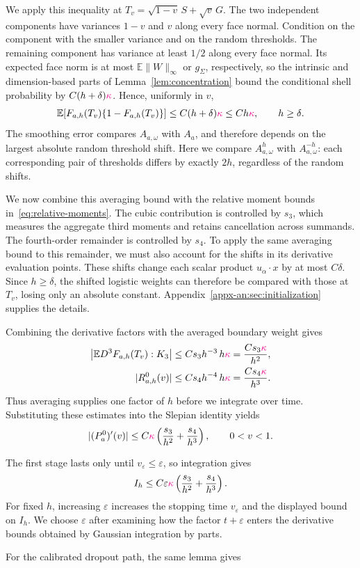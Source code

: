 \documentclass[11pt,letterpaper]{article}
\newcommand{\vSix}[1]{{\color{magenta}#1}}
\theoremstyle{remark}
\newcommand{\E}{\mathbb E}
\begin{document}
{{{We apply this inequality at \(T_v=\sqrt{1-v}\,S+\sqrt v\,G\).
The two independent components have variances \(1-v\) and \(v\)
along every face normal. Condition on the component with the smaller
variance and on the random thresholds. The remaining component has
variance at least \(1/2\) along every face normal. \vSix{Its expected face norm is at most
\(\E\|W\|_\infty\) or \(g_\Sigma\), respectively, so the intrinsic
and dimension-based parts of Lemma~\ref{lem:concentration}} bound the conditional shell probability
by \(C(h+\delta)\vSix{\kappa}\). Hence, uniformly in \(v\),
\[
 \E[F_{a,h}(T_v)\{1-F_{a,h}(T_v)\}]
 \le C(h+\delta)\vSix{\kappa}\le Ch\vSix{\kappa},
 \qquad {h\ge\delta}.
\]
The smoothing error compares \(A_{a,\omega}\) with \(A_a\), and
therefore depends on the largest absolute random threshold shift.
Here we compare \(A_{a,\omega}^{h}\) with \(A_{a,\omega}^{-h}\):
each corresponding pair of thresholds differs by exactly \(2h\),
regardless of the random shifts.
}

We now combine this averaging bound with the relative moment bounds
in~\eqref{eq:relative-moments}. The cubic contribution is controlled by
\(s_3\), which measures the aggregate third moments and retains
cancellation across summands. The fourth-order remainder is controlled
by \(s_4\). To apply the same averaging bound to this remainder, we must
also account for the shifts in its derivative evaluation points.
These shifts change each scalar product \(u_\alpha\cdot x\) by at most
\(C\delta\). {Since \(h\ge\delta\)}, the shifted logistic weights
can therefore be compared with those at \(T_v\), losing only an
absolute constant. Appendix~\ref{appx-an:sec:initialization} supplies the details.
}

Combining the derivative factors with the averaged boundary weight
gives
\[
\begin{aligned}
 \left|\E D^3F_{a,h}(T_v):K_3\right|
 &\le Cs_3h^{-3}\,h\vSix{\kappa}
 =\frac{Cs_3\vSix{\kappa}}{h^2},\\
 |R^0_{a,h}(v)|
 &\le Cs_4h^{-4}\,h\vSix{\kappa}
 =\frac{Cs_4\vSix{\kappa}}{h^3}.
\end{aligned}
\]
Thus averaging supplies one factor of \(h\) before we integrate over
time. Substituting these estimates into the Slepian identity yields
\[
 |(P_a^0)'(v)|
 \le C\vSix{\kappa}\left(\frac{s_3}{h^2}+\frac{s_4}{h^3}\right),
 \qquad 0<v<1.
\]

{
The first stage lasts only until \(v_\varepsilon\le\varepsilon\),
so integration gives
\[
 I_h\le C\varepsilon\vSix{\kappa}
       \left(\frac{s_3}{h^2}+\frac{s_4}{h^3}\right).
\]
For fixed \(h\), increasing \(\varepsilon\) increases the stopping
time \(v_\varepsilon\) and the displayed bound on \(I_h\). We choose
\(\varepsilon\) after examining how the factor \(t+\varepsilon\)
enters the derivative bounds obtained by Gaussian integration by parts.
}

For the calibrated dropout path, the same lemma gives}
\end{document}
